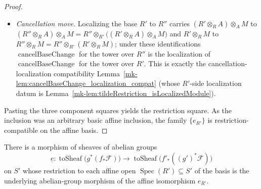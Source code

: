 \begin{proof}
\begin{itemize}
    \item \emph{Cancellation move.} Localizing the base \(R'\) to \(R''\) carries
      \((R'\otimes_R A)\otimes_A M\) to \((R''\otimes_R A)\otimes_A M = R'' \otimes_{R'}
      \bigl((R'\otimes_R A)\otimes_A M\bigr)\) and \(R'\otimes_R M\) to
      \(R''\otimes_R M = R'' \otimes_{R'} (R'\otimes_R M)\); under these identifications
      \(\operatorname{cancelBaseChange}\) for the tower over \(R''\) is the localization
      of \(\operatorname{cancelBaseChange}\) for the tower over \(R'\). This is exactly the
      cancellation-localization compatibility
      Lemma~\ref{mk-lem:cancelBaseChange_localization_compat} (whose \(R'\)-side localization
      datum is Lemma~\ref{mk-lem:tildeRestriction_isLocalizedModule}).
  \end{itemize}
  Pasting the three component squares yields the restriction square. As the inclusion
  was an arbitrary basic affine inclusion, the family \(\{e_{R'}\}\) is restriction-
  compatible on the affine basis.
\end{proof}

\begin{lemma}
  \label{mk-lem:pushforwardPullbackBaseChange_abHom}

  There is a morphism of sheaves of abelian groups
  \[
    \underline{e} :
    \operatorname{toSheaf}\bigl(g^*(f_*\mathcal{F})\bigr)
    \longrightarrow
    \operatorname{toSheaf}\bigl(f'_*((g')^*\mathcal{F})\bigr)
  \]
  on \(S'\) whose restriction to each affine open
  \(\operatorname{Spec}(R') \subseteq S'\) of the basis is the underlying
  abelian-group morphism of the affine isomorphism \(e_{R'}\).
\end{lemma}

